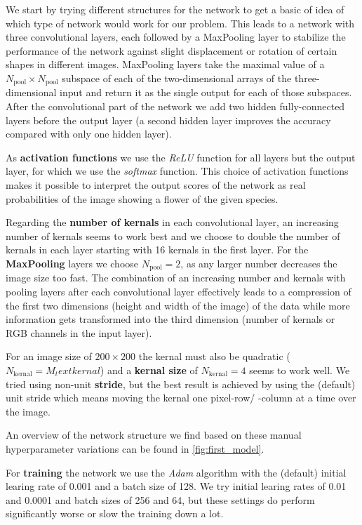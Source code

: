 We start by trying different structures for the network to get a basic of idea of which type of network would work for our problem.
This leads to a network with three convolutional layers, each followed by a MaxPooling layer to stabilize the performance of the network against slight displacement or rotation of certain shapes 
in different images. %
MaxPooling layers take the maximal value of a $N_\text{pool}\times N_\text{pool}$ subspace of each of the two-dimensional arrays of the three-dimensional input and return it as the single output 
for each of those subspaces.
After the convolutional part of the network we add two hidden fully-connected layers before the output layer (a second hidden layer improves the accuracy compared with only one hidden layer).

As \textbf{activation functions} we use the \textit{ReLU} function for all layers but the output layer, for which we use the \textit{softmax} function.
This choice of activation functions makes it possible to interpret the output scores of the network as real probabilities of the image showing a flower of the given species.

Regarding the \textbf{number of kernals} in each convolutional layer, an increasing number of kernals seems to work best and we choose to double the number of kernals in each layer
starting with 16 kernals in the first layer.
For the \textbf{MaxPooling} layers we choose $N_\text{pool} = 2$, as any larger number decreases the image size too fast.
The combination of an increasing number and kernals with pooling layers after each convolutional layer effectively leads to a compression of the first two dimensions (height and width of the image) 
of the data while more information gets transformed into the third dimension (number of kernals or RGB channels in the input layer).

For an image size of $200\times 200$ the kernal must also be quadratic ($N_\text{kernal} = M_text{kernal}$) and a \textbf{kernal size} of $N_\text{kernal} = 4$ seems to work well.
We tried using non-unit \textbf{stride}, but the best result is achieved by using the (default) unit stride which means moving the kernal one pixel-row/ -column at a time over the image.

An overview of the network structure we find based on these manual hyperparameter variations can be found in \autoref{fig:first_model}. 

For \textbf{training} the network we use the \textit{Adam} algorithm \cite{adam} with the (default) initial learing rate of 0.001 and a batch size of 128.
We try initial learing rates of 0.01 and 0.0001 and batch sizes of 256 and 64, but these settings do perform significantly worse or slow the training down a lot.

